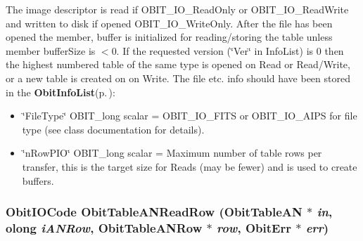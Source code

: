 The image descriptor is read if OBIT\_\-IO\_\-Read\-Only or OBIT\_\-IO\_\-Read\-Write and written to disk if opened OBIT\_\-IO\_\-Write\-Only. After the file has been opened the member, buffer is initialized for reading/storing the table unless member buffer\-Size is $<$0. If the requested version (\char`\"{}Ver\char`\"{} in Info\-List) is 0 then the highest numbered table of the same type is opened on Read or Read/Write, or a new table is created on on Write. The file etc. info should have been stored in the {\bf Obit\-Info\-List}{\rm (p.\,\pageref{structObitInfoList})}: \begin{itemize}
\item \char`\"{}File\-Type\char`\"{} OBIT\_\-long scalar = OBIT\_\-IO\_\-FITS or OBIT\_\-IO\_\-AIPS for file type (see class documentation for details). \item \char`\"{}n\-Row\-PIO\char`\"{} OBIT\_\-long scalar = Maximum number of table rows per transfer, this is the target size for Reads (may be fewer) and is used to create buffers. 
\end{itemize}
\subsubsection{\setlength{\rightskip}{0pt plus 5cm}Obit\-IOCode Obit\-Table\-ANRead\-Row ({\bf Obit\-Table\-AN} $\ast$ {\em in}, {\bf olong} {\em i\-ANRow}, {\bf Obit\-Table\-ANRow} $\ast$ {\em row}, {\bf Obit\-Err} $\ast$ {\em err})}\label{ObitTableAN_8h_a18}


